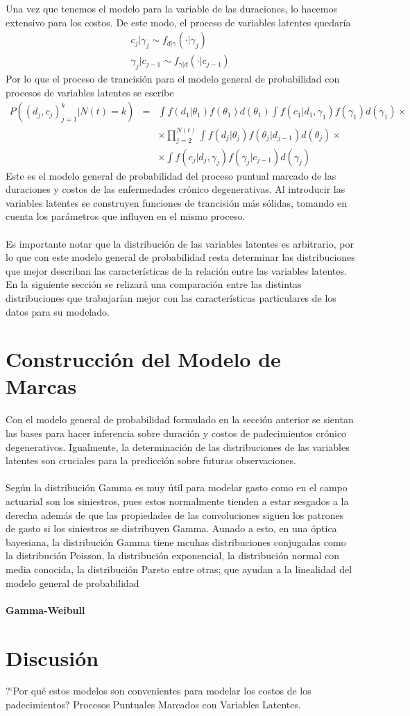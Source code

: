 Una vez que tenemos el modelo para la variable de las duraciones, lo hacemos extensivo para los costos. De este modo, el proceso de variables latentes quedar\'ia
\begin{align*}
c_{j}|\gamma_j \sim f_{d|\gamma}(\cdot|\gamma_j)\\
\gamma_j|c_{j-1} \sim f_{\gamma|d}(\cdot|c_{j-1})
\end{align*}
Por lo que el proceso de trancisi\'on para el modelo general de probabilidad con procesos de variables latentes se escribe
\begin{eqnarray}
P((d_j,c_j)_{j=1}^k|N(t)=k)&=& \int f(d_1|\theta_1)f(\theta_1)d(\theta_1) \int f(c_1|d_1,\gamma_1 ) f(\gamma_1)d(\gamma_1) \times \nonumber \\ 
&& \times \prod_{j=2}^{N(t)} \int f(d_j|\theta_j) f(\theta_j|d_{j-1}) d(\theta_j) \times \nonumber\\
&&\times \int f(c_j|d_j,\gamma_j)f(\gamma_j|c_{j-1})d(\gamma_j)  \nonumber
\end{eqnarray}
Este es el modelo general de probabilidad del proceso puntual marcado de las duraciones y costos de las enfermedades cr\'onico degenerativas. Al introducir las variables latentes se construyen funciones de trancisi\'on m\'as s\'olidas, tomando en cuenta los par\'ametros que influyen en el mismo proceso.\\
\\
Es importante notar que la distribuci\'on de las variables latentes es arbitrario, por lo que con este modelo general de probabilidad resta determinar las distribuciones que mejor describan las caracter\'isticas de la relaci\'on entre las variables latentes. En la siguiente secci\'on se relizar\'a una comparaci\'on entre las distintas distribuciones que trabajar\'ian mejor con las caracter\'isticas particulares de los datos para su modelado.\\

\section{Construcci\'on del Modelo de Marcas}
Con el modelo general de probabilidad formulado en la secci\'on anterior se sientan las bases para hacer inferencia sobre duraci\'on y costos de padecimientos cr\'onico degenerativos. Igualmente, la determinaci\'on de las distribuciones de las variables latentes son cruciales para la predicci\'on sobre futuras observaciones.\\
\\
Seg\'un \cite{fader2013gamma} la distribuci\'on Gamma es muy \'util para modelar gasto como en el campo actuarial son los siniestros, pues estos normalmente tienden a estar sesgados a la derecha adem\'as de que las propiedades de las convoluciones siguen los patrones de gasto si los siniestros se distribuyen Gamma. Aunado a esto, en una \'optica bayesiana, la distribuci\'on Gamma tiene mcuhas distribuciones conjugadas como la distribuci\'on Poisson, la distribuci\'on exponencial, la distribuci\'on normal con media conocida, la distribuci\'on Pareto entre otras; que ayudan a la linealidad del modelo general de probabilidad \\
\\
\textbf{Gamma-Weibull}
\section{Discusi\'on}
?`Por qu\'e estos modelos son convenientes para modelar los costos de los padecimientos? Procesos Puntuales Marcados con Variables Latentes.